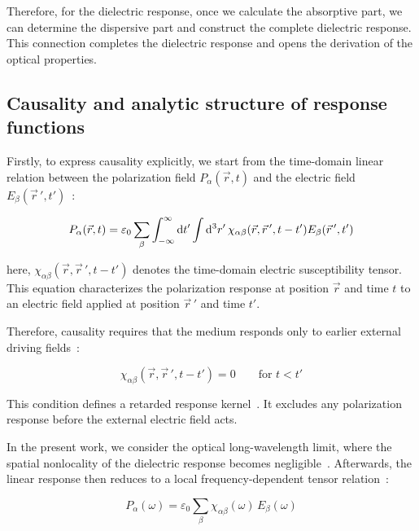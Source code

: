 Therefore, for the dielectric response, once we calculate the absorptive part,
we can determine the dispersive part and construct the complete dielectric response.
This connection completes the dielectric response and opens the derivation of the optical properties.

\subsection{Causality and analytic structure of response functions}

Firstly, to express causality explicitly, 
we start from the time-domain linear relation between
the polarization field $P_{\alpha}(\vec{r},t)$ and
the electric field $E_{\beta}(\vec{r}\,',t')$~\cite{dressel2002electrodynamics}:

\begin{equation}
    P_{\alpha}(\vec{r},t) = 
    \varepsilon_0\sum_{\beta}\int_{-\infty}^{\infty}\mathrm{d}{t'}
    \int\mathrm{d}^3{r'}\,\chi_{\alpha\beta}(\vec{r},\vec{r}\,',t-t')
    E_{\beta}(\vec{r}\,',t')
\label{general_linear_response_polarization}
\end{equation}

here, $\chi_{\alpha\beta}(\vec{r},\vec{r}\,',t-t')$ denotes the time-domain electric susceptibility tensor.
This equation characterizes the polarization response at position $\vec{r}$ and time $t$ to an electric field applied at position $\vec{r}\,'$ and time $t'$.

Therefore, causality requires that the medium responds only to earlier external driving fields~\cite{stefanski2022analytical}:

\begin{equation}
    \chi_{\alpha\beta}(\vec{r},\vec{r}\,',t-t')=0
    \qquad \text{for $t<t'$}
\label{causal_condition_susceptibility_kernel}
\end{equation}

This condition defines a retarded response kernel~\cite{landau2013electrodynamics}.
It excludes any polarization response before the external electric field acts.

In the present work,
we consider the optical long-wavelength limit,
where the spatial nonlocality of the dielectric response becomes negligible~\cite{agranovich2013crystal}.
Afterwards, the linear response then reduces to a local frequency-dependent tensor relation~\cite{franta2023dispersion}:

\begin{equation}
    P_{\alpha}(\omega) =
    \varepsilon_0\sum_{\beta}\chi_{\alpha\beta}(\omega)
    \,E_{\beta}(\omega)
\label{frequency_domain_polarization_response}
\end{equation}

